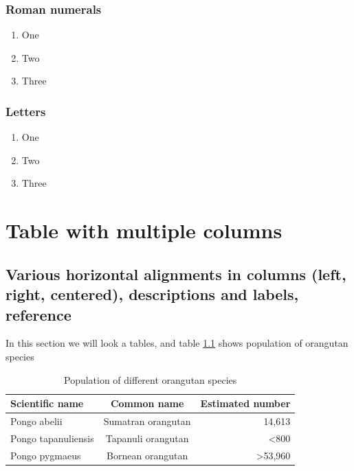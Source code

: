 \documentclass[a4paper]{report}
\begin{document}
        \subsection{Roman numerals} 
            \begin{enumerate}[label=(\roman*)]
                \item One
                \item Two
                \item Three
            \end{enumerate}
            
        \subsection{Letters} 
            \begin{enumerate}[label=\alph*)]
                \item One
                \item Two
                \item Three
            \end{enumerate}
            

\chapter{Table with multiple columns}

\section{Various horizontal alignments in columns (left, right, centered), descriptions and labels, reference}
    In this section we will look a tables, and table \ref{table:orangutan_population_horizontal_alignments} shows population of orangutan species\cite{sen2005cute}
    \begin{table}[!h]
        \begin{tabular}{lll}
            \hline
            \multicolumn{1}{|l|}{\textbf{Scientific name}} & \multicolumn{1}{c|}{\textbf{Common name}} & \multicolumn{1}{r|}{\textbf{Estimated number}} \\ \hline
            \multicolumn{1}{|l|}{Pongo abelii}             & \multicolumn{1}{c|}{Sumatran orangutan}   & \multicolumn{1}{r|}{14,613}           \\ \hline
            \multicolumn{1}{|l|}{Pongo tapanuliensis}      & \multicolumn{1}{c|}{Tapanuli orangutan}   & \multicolumn{1}{r|}{\textless{}800}   \\ \hline
            \multicolumn{1}{|l|}{Pongo pygmaeus}           & \multicolumn{1}{c|}{Bornean orangutan}    & \multicolumn{1}{r|}{\textgreater{}53,960}   \\ \hline
        \end{tabular}     
        \caption{Population of different orangutan species}
        \label{table:orangutan_population_horizontal_alignments}
    \end{table}
    
\end{document}
